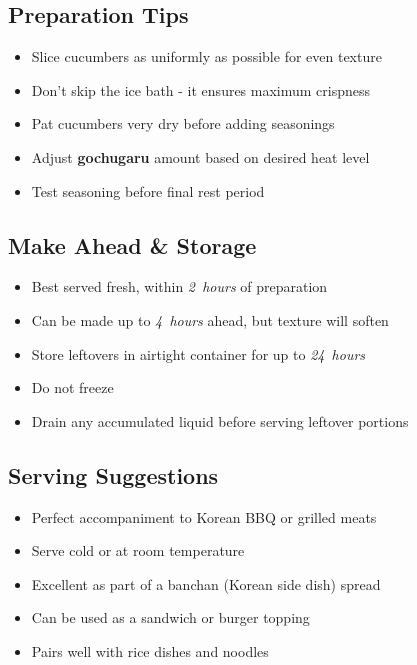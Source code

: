 \documentclass[11pt,letterpaper]{article}
\begin{document}
{\begin{multicols}{2}
\subsection*{Preparation Tips}
\begin{itemize}
    \item Slice cucumbers as uniformly as possible for even texture
    \item Don't skip the ice bath - it ensures maximum crispness
    \item Pat cucumbers very dry before adding seasonings
    \item Adjust \textbf{gochugaru} amount based on desired heat level
    \item Test seasoning before final rest period
\end{itemize}

\subsection*{Make Ahead \& Storage}
\begin{itemize}
    \item Best served fresh, within \textit{2~hours} of preparation
    \item Can be made up to \textit{4~hours} ahead, but texture will soften
    \item Store leftovers in airtight container for up to \textit{24~hours}
    \item Do not freeze
    \item Drain any accumulated liquid before serving leftover portions
\end{itemize}

\subsection*{Serving Suggestions}
\begin{itemize}
    \item Perfect accompaniment to Korean BBQ or grilled meats
    \item Serve cold or at room temperature
    \item Excellent as part of a banchan (Korean side dish) spread
    \item Can be used as a sandwich or burger topping
    \item Pairs well with rice dishes and noodles
\end{itemize}

\end{multicols}
}
\end{document}
